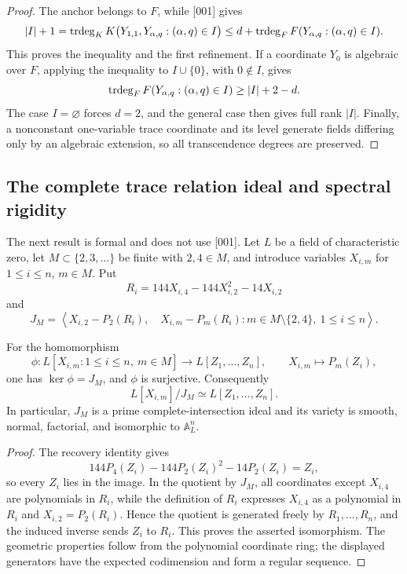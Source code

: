 \begin{proof}
The anchor belongs to \(F\), while [001] gives
\[
 |I|+1
 =\operatorname{trdeg}_KK\bigl(Y_{1,1},Y_{\alpha,q}:(\alpha,q)\in I\bigr)
 \le d+\operatorname{trdeg}_FF(Y_{\alpha,q}:(\alpha,q)\in I).
\]
This proves the inequality and the first refinement.  If a coordinate
\(Y_0\) is algebraic over \(F\), applying the inequality to
\(I\cup\{0\}\), with \(0\notin I\), gives
\[
 \operatorname{trdeg}_FF(Y_{\alpha,q}:(\alpha,q)\in I)\ge |I|+2-d.
\]
The case \(I=\varnothing\) forces \(d=2\), and the general case then gives
full rank \(|I|\).  Finally, a nonconstant one-variable trace coordinate
and its level generate fields differing only by an algebraic extension, so
all transcendence degrees are preserved.
\end{proof}

\subsection{The complete trace relation ideal and spectral rigidity}

The next result is formal and does not use [001].  Let \(L\) be a field of
characteristic zero, let \(M\subset\{2,3,\ldots\}\) be finite with
\(2,4\in M\), and introduce variables \(X_{i,m}\) for
\(1\le i\le n\), \(m\in M\).  Put
\[
 R_i=144X_{i,4}-144X_{i,2}^2-14X_{i,2}
\]
and
\[
 J_M=\left\langle
 X_{i,2}-P_2(R_i),\quad
 X_{i,m}-P_m(R_i):m\in M\setminus\{2,4\},\ 1\le i\le n
 \right\rangle.
\]

\begin{proposition}
\label{prop:transfer-trace-ideal}
For the homomorphism
\[
 \phi:L[X_{i,m}:1\le i\le n,\ m\in M]
 \longrightarrow L[Z_1,\ldots,Z_n],
 \qquad X_{i,m}\longmapsto P_m(Z_i),
\]
one has \(\ker\phi=J_M\), and \(\phi\) is surjective.  Consequently
\[
 L[X_{i,m}]/J_M\simeq L[Z_1,\ldots,Z_n].
\]
In particular, \(J_M\) is a prime complete-intersection ideal and its
variety is smooth, normal, factorial, and isomorphic to \(\mathbb A_L^n\).
\end{proposition}

\begin{proof}
The recovery identity gives
\[
 144P_4(Z_i)-144P_2(Z_i)^2-14P_2(Z_i)=Z_i,
\]
so every \(Z_i\) lies in the image.  In the quotient by \(J_M\), all
coordinates except \(X_{i,4}\) are polynomials in \(R_i\), while the
definition of \(R_i\) expresses \(X_{i,4}\) as a polynomial in
\(R_i\) and \(X_{i,2}=P_2(R_i)\).  Hence the quotient is generated freely
by \(R_1,\ldots,R_n\), and the induced inverse sends \(Z_i\) to \(R_i\).
This proves the asserted isomorphism.  The geometric properties follow
from the polynomial coordinate ring; the displayed generators have the
expected codimension and form a regular sequence.
\end{proof}

